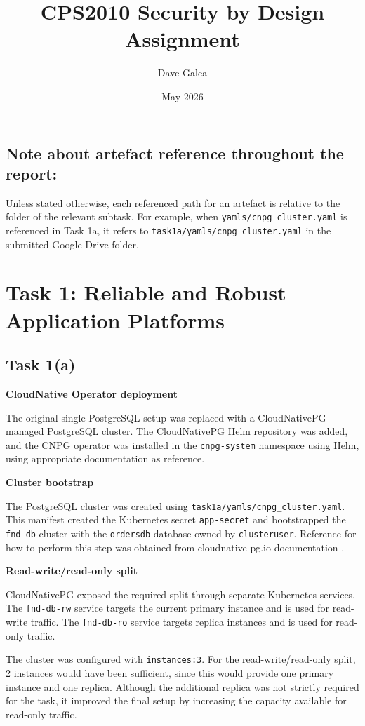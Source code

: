 \documentclass[11pt,a4paper]{article}
\title{CPS2010 Security by Design Assignment}
\author{Dave Galea}
\date{May 2026}
\begin{document}
	\maketitle
	\tableofcontents
	\newpage
	
	\subsection{Note about artefact reference throughout the report:}
	Unless stated otherwise, each referenced path for an artefact is relative to the folder of the relevant subtask. For example, when \texttt{yamls/cnpg\_cluster.yaml} is referenced in Task 1a, it refers to \texttt{task1a/yamls/cnpg\_cluster.yaml} in the submitted Google Drive folder.
	
	\section{Task 1: Reliable and Robust Application Platforms}
	
	\subsection{Task 1(a)}
	
	\textbf{CloudNative Operator deployment}
	
	The original single PostgreSQL setup was replaced with a CloudNativePG-managed PostgreSQL cluster. The CloudNativePG Helm repository was added, and the CNPG operator was installed in the \texttt{cnpg-system} namespace using Helm, using appropriate documentation \cite{cnpgdownload} as reference.

	
	\textbf{Cluster bootstrap}
	
	The PostgreSQL cluster was created using \texttt{task1a/yamls/cnpg\_cluster.yaml}. This manifest created the Kubernetes secret \texttt{app-secret} and bootstrapped the \texttt{fnd-db} cluster with the \texttt{ordersdb} database owned by \texttt{clusteruser}. Reference for how to perform this step was obtained from cloudnative-pg.io documentation \cite{cnpgbootstrap}.
	
	
	\textbf{Read-write/read-only split}
	
	CloudNativePG exposed the required split through separate Kubernetes services. The \texttt{fnd-db-rw} service targets the current primary instance and is used for read-write traffic. The \texttt{fnd-db-ro} service targets replica instances and is used for read-only traffic.
	
	The cluster was configured with \texttt{instances:3}. For the read-write/read-only split, 2 instances would have been sufficient, since this would provide one primary instance and one replica. Although the additional replica was not strictly required for the task, it improved the final setup by increasing the capacity available for read-only traffic.
	
\end{document}
